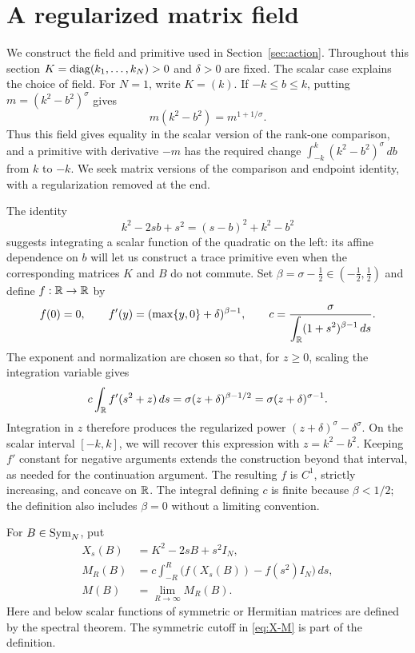 \section{A regularized matrix field}\label{sec:field}

We construct the field and primitive used in Section~\ref{sec:action}.
Throughout this section $K=\operatorname{diag}(k_1,\ldots,k_N)>0$ and $\delta>0$ are fixed.
The scalar case explains the choice of field. For $N=1$, write $K=(k)$.
If $-k\le b\le k$, putting $m=(k^2-b^2)^\sigma$ gives
\[
 m(k^2-b^2)=m^{1+1/\sigma}.
\]
Thus this field gives equality in the scalar version of the rank-one
comparison, and a primitive with derivative $-m$ has the required change
$\int_{-k}^k(k^2-b^2)^\sigma\,db$ from $k$ to $-k$.
We seek matrix versions of the comparison and endpoint identity,
with a regularization removed at the end.

The identity
\[
 k^2-2sb+s^2=(s-b)^2+k^2-b^2
\]
suggests integrating a scalar function of the quadratic on the left:
its affine dependence on $b$ will let us construct a trace primitive
even when the corresponding matrices $K$ and $B$ do not commute.
Set $\beta=\sigma-\tfrac12\in(-\tfrac12,\tfrac12)$ and define
$f:\mathbb R\to\mathbb R$ by
\begin{equation}\label{eq:f}
 f(0)=0,\qquad f'(y)=(\max\{y,0\}+\delta)^{\beta-1},
 \qquad
 c=\frac{\sigma}{\displaystyle\int_\mathbb R(1+s^2)^{\beta-1}\,ds}.
\end{equation}
The exponent and normalization are chosen so that, for $z\ge0$,
scaling the integration variable gives
\[
 c\int_\mathbb R f'(s^2+z)\,ds
 =\sigma(z+\delta)^{\beta-1/2}
 =\sigma(z+\delta)^{\sigma-1}.
\]
Integration in $z$ therefore produces the regularized power
$(z+\delta)^\sigma-\delta^\sigma$. On the scalar interval $[-k,k]$,
we will recover this expression with $z=k^2-b^2$.
Keeping $f'$ constant for negative arguments extends the construction
beyond that interval, as needed for the continuation argument.
The resulting $f$ is $C^1$, strictly increasing, and concave on $\mathbb R$.
The integral defining $c$ is finite because $\beta<1/2$; the definition
also includes $\beta=0$ without a limiting convention.

For $B\in\operatorname{Sym}_N$, put
\begin{equation}\label{eq:X-M}
 \begin{split}
 X_s(B)&=K^2-2sB+s^2I_N,\\
 M_R(B)&=c\int_{-R}^R\bigl(f(X_s(B))-f(s^2)I_N\bigr)\,ds,\\
 M(B)&=\lim_{R\to\infty}M_R(B).
 \end{split}
\end{equation}
Here and below scalar functions of symmetric or Hermitian matrices are
defined by the spectral theorem. The symmetric cutoff in
\eqref{eq:X-M} is part of the definition.

